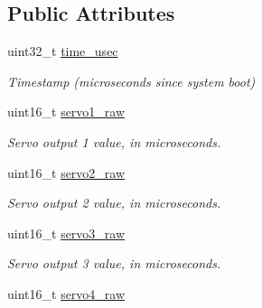 \subsection*{Public Attributes}
\begin{DoxyCompactItemize}
\item 
\hypertarget{struct____mavlink__servo__output__raw__t_a77950505a736593e2c35132a1688c8f1}{uint32\+\_\+t \hyperlink{struct____mavlink__servo__output__raw__t_a77950505a736593e2c35132a1688c8f1}{time\+\_\+usec}}\label{struct____mavlink__servo__output__raw__t_a77950505a736593e2c35132a1688c8f1}

\begin{DoxyCompactList}\small\item\em Timestamp (microseconds since system boot) \end{DoxyCompactList}\item 
\hypertarget{struct____mavlink__servo__output__raw__t_a5651abf79f8df0da7407b2329fedcdb2}{uint16\+\_\+t \hyperlink{struct____mavlink__servo__output__raw__t_a5651abf79f8df0da7407b2329fedcdb2}{servo1\+\_\+raw}}\label{struct____mavlink__servo__output__raw__t_a5651abf79f8df0da7407b2329fedcdb2}

\begin{DoxyCompactList}\small\item\em Servo output 1 value, in microseconds. \end{DoxyCompactList}\item 
\hypertarget{struct____mavlink__servo__output__raw__t_aa19900df91d866a507cf3261d4b6aeda}{uint16\+\_\+t \hyperlink{struct____mavlink__servo__output__raw__t_aa19900df91d866a507cf3261d4b6aeda}{servo2\+\_\+raw}}\label{struct____mavlink__servo__output__raw__t_aa19900df91d866a507cf3261d4b6aeda}

\begin{DoxyCompactList}\small\item\em Servo output 2 value, in microseconds. \end{DoxyCompactList}\item 
\hypertarget{struct____mavlink__servo__output__raw__t_a8aa15f79b56b08694b77bfa6d1788554}{uint16\+\_\+t \hyperlink{struct____mavlink__servo__output__raw__t_a8aa15f79b56b08694b77bfa6d1788554}{servo3\+\_\+raw}}\label{struct____mavlink__servo__output__raw__t_a8aa15f79b56b08694b77bfa6d1788554}

\begin{DoxyCompactList}\small\item\em Servo output 3 value, in microseconds. \end{DoxyCompactList}\item 
\hypertarget{struct____mavlink__servo__output__raw__t_aa9a775a58d71f44c00955771dc758012}{uint16\+\_\+t \hyperlink{struct____mavlink__servo__output__raw__t_aa9a775a58d71f44c00955771dc758012}{servo4\+\_\+raw}}\label{struct____mavlink__servo__output__raw__t_aa9a775a58d71f44c00955771dc758012}


\end{DoxyCompactItemize}
